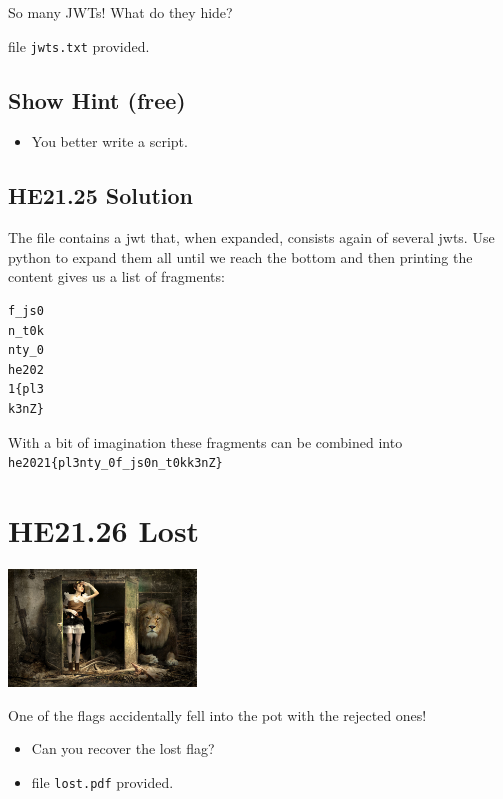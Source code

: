 \documentclass[english,a4paper,nols,noindent]{tufte-handout}
\begin{document}
\noindent So many JWTs! What do they hide?

\noindent file \verb+jwts.txt+ provided.

\subsection{Show Hint (free)}
\begin{itemize}
\item You better write a script.
\end{itemize}

\hypertarget{he21.25-solution}{%
\subsection{HE21.25 Solution}\label{he21.25-solution}}

\noindent The file contains a jwt that, when expanded, consists again of
several jwts.  Use python to expand them all until we reach the bottom and then
printing the content gives us a list of fragments:

\begin{verbatim}
f_js0
n_t0k
nty_0
he202
1{pl3
k3nZ}
\end{verbatim}

With a bit of imagination these fragments can be combined into
\verb+he2021{pl3nty_0f_js0n_t0kk3nZ}+

\hypertarget{he21.26}{%
  \section{HE21.26 Lost}
  \label{he21.26}}
\begin{marginfigure}
    \includegraphics[width=50mm]{images/challenge26.jpg}
\end{marginfigure}

\noindent One of the flags accidentally fell into the pot with the rejected ones!

\begin{itemize}
\item Can you recover the lost flag?
\item file \verb+lost.pdf+ provided.
\end{itemize}
\end{document}
